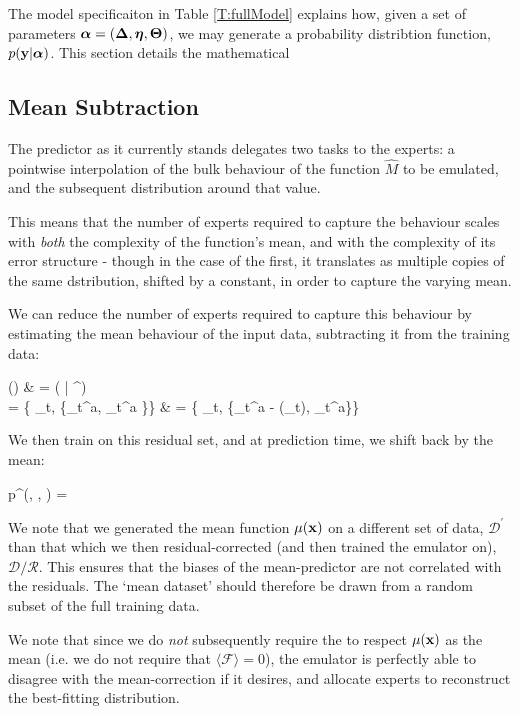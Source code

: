 
The model specificaiton in Table \ref{T:fullModel} explains how, given a set of parameters $\mathbf{\boldsymbol{\mathrm{\alpha}}} = (\mathbf{\boldsymbol{\mathrm{\Delta}}}, \mathbf{\boldsymbol{\mathrm{\eta}}}, \mathbf{\boldsymbol{\mathrm{\Theta}}})$, we may generate a probability distribtion function, $p(\mathbf{\boldsymbol{\mathrm{y}}} | \mathbf{\boldsymbol{\mathrm{\alpha}}})$. This section details the mathematical

\subsection{Mean Subtraction} \label{S:BLP}

	The \fade{} predictor as it currently stands delegates two tasks to the experts: a pointwise interpolation of the bulk behaviour of the function $\hat{M}$ to be emulated, and the subsequent distribution around that value.

	This means that the number of experts required to capture the behaviour scales with \textit{both} the complexity of the function's mean, and with the complexity of its error structure - though in the case of the first, it translates as multiple copies of the same dstribution, shifted by a constant, in order to capture the varying mean.

	We can reduce the number of experts required to capture this behaviour by estimating the mean behaviour of the input data, subtracting it from the training data:
	\begin{spalign}
		\mu() & = \mu( | ^\prime)
		\\
		 = \left\{ \x_t, \{\y_t^a, \zeta_t^a \}\right\} \quad & \to \quad {} = \left\{ \x_t, \{\y_t^a - \mu(\x_t), \zeta_t^a\}\right\}
	\end{spalign}
	We then train on this residual set, and at prediction time, we shift back by the mean:
	\begin{spalign}
		p^(\y, \x, \vec{\alpha}) = 
	\end{spalign}
	We note that we generated the mean function $\mu(\mathbf{\boldsymbol{\mathrm{x}}})$ on a different set of data, $\mathcal{D}^\prime$ than that which we then residual-corrected (and then trained the emulator on), $\mathcal{D} / \mathcal{R}$. This ensures that the biases of the mean-predictor are not correlated with the residuals. The `mean dataset' should therefore be drawn from a random subset of the full training data.

	We note that since we do \textit{not} subsequently require the \fade{} to respect $\mu(\mathbf{\boldsymbol{\mathrm{x}}})$ as the mean (i.e. we do not require that $\langle \mathcal{F} \rangle = 0$), the emulator is perfectly able to disagree with the mean-correction if it desires, and allocate experts to reconstruct the best-fitting distribution.

